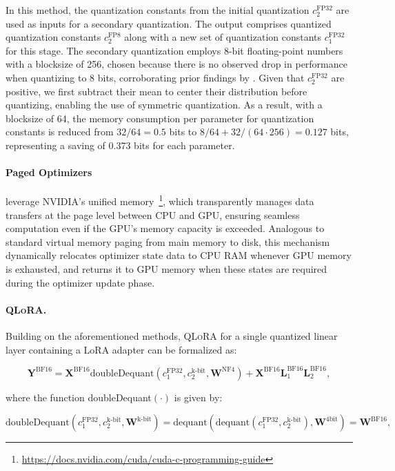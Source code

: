 In this method, the quantization constants from the initial quantization $c_2^{\text{FP32}}$ are used as inputs for a secondary quantization. The output comprises quantized quantization constants $c_2^{\text{FP8}}$ along with a new set of quantization constants $c_1^{\text{FP32}}$ for this stage. The secondary quantization employs 8-bit floating-point numbers with a blocksize of 256, chosen because there is no observed drop in performance when quantizing to 8 bits, corroborating prior findings by \citet{dettmers2022case}. Given that $c_2^{\text{FP32}}$ are positive, we first subtract their mean to center their distribution before quantizing, enabling the use of symmetric quantization. As a result, with a blocksize of 64, the memory consumption per parameter for quantization constants is reduced from $32/64 = 0.5$ bits to $8/64 + 32/(64 \cdot 256) = 0.127$ bits, representing a saving of 0.373 bits for each parameter.

\paragraph{Paged Optimizers} leverage NVIDIA’s unified memory~\footnote{\tiny \url{https://docs.nvidia.com/cuda/cuda-c-programming-guide}}, which transparently manages data transfers at the page level between CPU and GPU, ensuring seamless computation even if the GPU’s memory capacity is exceeded. Analogous to standard virtual memory paging from main memory to disk, this mechanism dynamically relocates optimizer state data to CPU RAM whenever GPU memory is exhausted, and returns it to GPU memory when these states are required during the optimizer update phase.

\paragraph{\textsc{QLoRA}.} Building on the aforementioned methods, \textsc{QLoRA} for a single quantized linear layer containing a LoRA adapter can be formalized as:

\begin{equation}
    \mathbf{Y}^{\text{BF16}} =  \mathbf{X}^{\text{BF16}} \text{doubleDequant}(c_1^{\text{FP32}}, c_2^{\text{k-bit}}, \mathbf{W}^{\text{NF4}}) + \mathbf{X}^{\text{BF16}}\mathbf{L}^{\text{BF16}}_1\mathbf{L}^{\text{BF16}}_2,
\end{equation}

where the function doubleDequant$(\cdot)$ is given by:

\begin{equation}
    \text{doubleDequant}(c_1^{\text{FP32}}, c_2^{\text{k-bit}}, \mathbf{W}^{\text{k-bit}}) = \text{dequant}(\text{dequant}(c_1^{\text{FP32}}, c_2^{\text{k-bit}}), \mathbf{W}^{\text{4bit}}) = \mathbf{W}^{\text{BF16}},
\end{equation}

